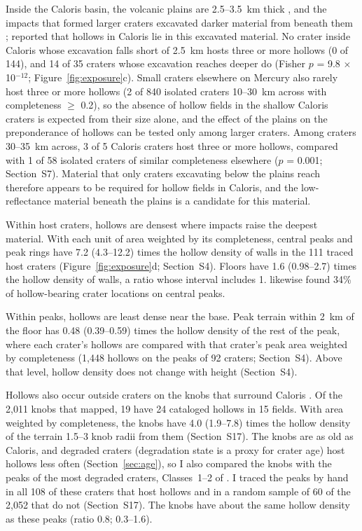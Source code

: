 \documentclass[article,review]{planetary}
\begin{document}
Inside the Caloris basin, the volcanic plains are 2.5--3.5~km thick \parencite{ernst2015}, and the impacts that formed larger craters excavated darker material from beneath them \parencite{murchie2008}; \textcite{blewett2013} reported that hollows in Caloris lie in this excavated material. No crater inside Caloris whose excavation falls short of 2.5~km hosts three or more hollows (0 of 144), and 14 of 35 craters whose excavation reaches deeper do (Fisher $p$ = 9.8 $\times$ 10$^{-12}$; Figure~\ref{fig:exposure}c). Small craters elsewhere on Mercury also rarely host three or more hollows (2 of 840 isolated craters 10--30~km across with completeness $\geq$ 0.2), so the absence of hollow fields in the shallow Caloris craters is expected from their size alone, and the effect of the plains on the preponderance of hollows can be tested only among larger craters. Among craters 30--35~km across, 3 of 5 Caloris craters host three or more hollows, compared with 1 of 58 isolated craters of similar completeness elsewhere ($p$ = 0.001; Section~S7). Material that only craters excavating below the plains reach therefore appears to be required for hollow fields in Caloris, and the low-reflectance material beneath the plains is a candidate for this material.

Within host craters, hollows are densest where impacts raise the deepest material. With each unit of area weighted by its completeness, central peaks and peak rings have 7.2 (4.3--12.2) times the hollow density of walls in the 111 traced host craters (Figure~\ref{fig:exposure}d; Section~S4). Floors have 1.6 (0.98--2.7) times the hollow density of walls, a ratio whose interval includes 1. \textcite{detoffoli2024} likewise found 34\% of hollow-bearing crater locations on central peaks.

Within peaks, hollows are least dense near the base. Peak terrain within 2~km of the floor has 0.48 (0.39--0.59) times the hollow density of the rest of the peak, where each crater's hollows are compared with that crater's peak area weighted by completeness (1,448 hollows on the peaks of 92 craters; Section~S4). Above that level, hollow density does not change with height (Section~S4).

Hollows also occur outside craters on the knobs that surround Caloris \parencite{wright2020}. Of the 2,011 knobs that \textcite{wright2020} mapped, 19 have 24 cataloged hollows in 15 fields. With area weighted by completeness, the knobs have 4.0 (1.9--7.8) times the hollow density of the terrain 1.5--3 knob radii from them (Section~S17). The knobs are as old as Caloris, and degraded craters (degradation state is a proxy for crater age) host hollows less often (Section~\ref{sec:age}), so I also compared the knobs with the peaks of the most degraded craters, Classes~1--2 of \textcite{kinczykMorphologicalEvaluationCrater2020}. I traced the peaks by hand in all 108 of these craters that host hollows and in a random sample of 60 of the 2,052 that do not (Section~S17). The knobs have about the same hollow density as these peaks (ratio 0.8; 0.3--1.6).
\end{document}
